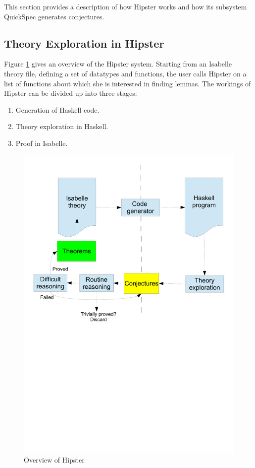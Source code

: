 \label{sec:background}
This section provides a description of how Hipster works and how its subsystem QuickSpec generates conjectures.

\subsection{Theory Exploration in Hipster}
Figure \ref{fig:hipster} gives an overview of the Hipster system. Starting from an Isabelle theory file, defining a set of datatypes and functions, the user calls Hipster on a list of functions about which she is interested in finding lemmas. The workings of Hipster can be divided up into three stages:
\begin{enumerate}
\item Generation of Haskell code. 
\item Theory exploration in Haskell.
\item Proof in Isabelle.
\end{enumerate}
\begin{figure}[htbp]
\begin{center}
\includegraphics[scale=0.4]{hipster}
\caption{Overview of Hipster}
\label{fig:hipster}
\end{center}
\end{figure}
